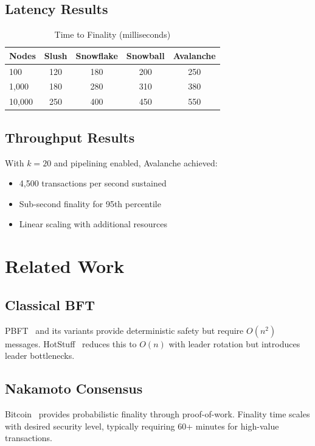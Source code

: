 \documentclass[11pt,a4paper]{article}
\begin{document}
\subsection{Latency Results}

\begin{table}[h]
\centering
\caption{Time to Finality (milliseconds)}
\begin{tabular}{@{}lcccc@{}}
\toprule
Nodes & Slush & Snowflake & Snowball & Avalanche \\
\midrule
100 & 120 & 180 & 200 & 250 \\
1,000 & 180 & 280 & 310 & 380 \\
10,000 & 250 & 400 & 450 & 550 \\
\bottomrule
\end{tabular}
\end{table}

\subsection{Throughput Results}

With $k=20$ and pipelining enabled, Avalanche achieved:
\begin{itemize}
    \item 4,500 transactions per second sustained
    \item Sub-second finality for 95th percentile
    \item Linear scaling with additional resources
\end{itemize}

\section{Related Work}

\subsection{Classical BFT}

PBFT~\cite{pbft} and its variants provide deterministic safety but require $O(n^2)$ messages. HotStuff~\cite{hotstuff} reduces this to $O(n)$ with leader rotation but introduces leader bottlenecks.

\subsection{Nakamoto Consensus}

Bitcoin~\cite{bitcoin} provides probabilistic finality through proof-of-work. Finality time scales with desired security level, typically requiring 60+ minutes for high-value transactions.
\end{document}
